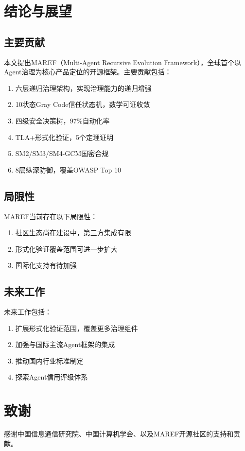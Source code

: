 \section{结论与展望}

\subsection{主要贡献}

本文提出MAREF（Multi-Agent Recursive Evolution Framework），全球首个以Agent治理为核心产品定位的开源框架。主要贡献包括：

\begin{enumerate}
    \item 六层递归治理架构，实现治理能力的递归增强
    \item 10状态Gray Code信任状态机，数学可证收敛
    \item 四级安全决策树，97\%自动化率
    \item TLA+形式化验证，5个定理证明
    \item SM2/SM3/SM4-GCM国密合规
    \item 8层纵深防御，覆盖OWASP Top 10
\end{enumerate}

\subsection{局限性}

MAREF当前存在以下局限性：

\begin{enumerate}
    \item 社区生态尚在建设中，第三方集成有限
    \item 形式化验证覆盖范围可进一步扩大
    \item 国际化支持有待加强
\end{enumerate}

\subsection{未来工作}

未来工作包括：

\begin{enumerate}
    \item 扩展形式化验证范围，覆盖更多治理组件
    \item 加强与国际主流Agent框架的集成
    \item 推动国内行业标准制定
    \item 探索Agent信用评级体系
\end{enumerate}

\section*{致谢}

感谢中国信息通信研究院、中国计算机学会、以及MAREF开源社区的支持和贡献。
